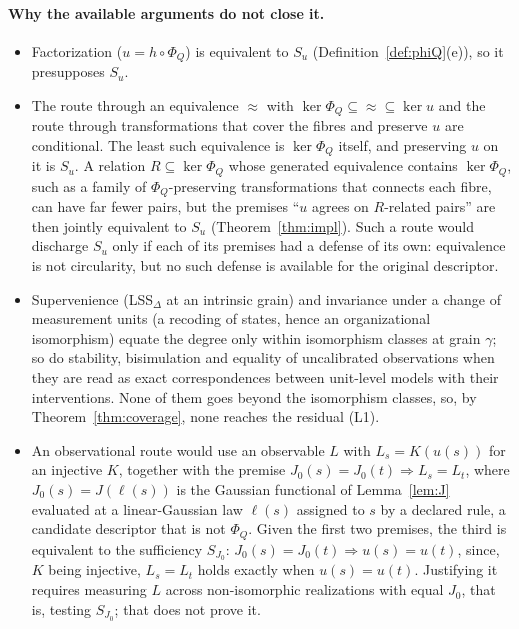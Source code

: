 \paragraph{Why the available arguments do not close it.}
\begin{itemize}
\item Factorization ($u=h\circ\Phi_Q$) is equivalent to $S_u$ (Definition~\ref{def:phiQ}(e)), so it presupposes $S_u$.
\item The route through an equivalence ${\approx}$ with $\ker\Phi_Q\subseteq{\approx}\subseteq\ker u$ and the route through transformations that cover the fibres and preserve $u$ are conditional. The least such equivalence is $\ker\Phi_Q$ itself, and preserving $u$ on it is $S_u$. A relation $R\subseteq\ker\Phi_Q$ whose generated equivalence contains $\ker\Phi_Q$, such as a family of $\Phi_Q$-preserving transformations that connects each fibre, can have far fewer pairs, but the premises ``$u$ agrees on $R$-related pairs'' are then jointly equivalent to $S_u$ (Theorem~\ref{thm:impl}). Such a route would discharge $S_u$ only if each of its premises had a defense of its own: equivalence is not circularity, but no such defense is available for the original descriptor.
\item Supervenience (LSS$_\Delta$ at an intrinsic grain) and invariance under a change of measurement units (a recoding of states, hence an organizational isomorphism) equate the degree only within isomorphism classes at grain $\gamma$; so do stability, bisimulation and equality of uncalibrated observations when they are read as exact correspondences between unit-level models with their interventions. None of them goes beyond the isomorphism classes, so, by Theorem~\ref{thm:coverage}, none reaches the residual (L1).
\item An observational route would use an observable $L$ with $L_s=K(u(s))$ for an injective $K$, together with the premise $J_0(s)=J_0(t)\Rightarrow L_s=L_t$, where $J_0(s)=J(\ell(s))$ is the Gaussian functional of Lemma~\ref{lem:J} evaluated at a linear-Gaussian law $\ell(s)$ assigned to $s$ by a declared rule, a candidate descriptor that is not $\Phi_Q$. Given the first two premises, the third is equivalent to the sufficiency $S_{J_0}$: $J_0(s)=J_0(t)\Rightarrow u(s)=u(t)$, since, $K$ being injective, $L_s=L_t$ holds exactly when $u(s)=u(t)$. Justifying it requires measuring $L$ across non-isomorphic realizations with equal $J_0$, that is, testing $S_{J_0}$; that does not prove it.
\end{itemize}

